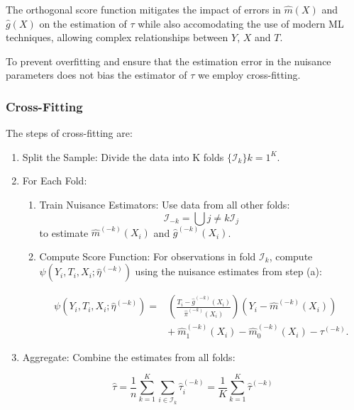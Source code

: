 \documentclass{article}
\numberwithin{equation}{section}
\begin{document}
The orthogonal score function mitigates the impact of errors in $\hat{m}(X)$ and $\hat{g}(X)$ on the estimation of $\tau$ while also accomodating the use of modern ML techniques, allowing complex relationships between $Y$, $X$ and $T$.

To prevent overfitting and ensure that the estimation error in the nuisance parameters does not bias the estimator of $\tau$ we employ cross-fitting.

\subsubsection{Cross-Fitting}

The steps of cross-fitting are:

\begin{enumerate}
\item Split the Sample: Divide the data into K folds $\{\mathcal{I}_k\}{k=1}^K$.
\item For Each Fold:
\begin{enumerate}
\item Train Nuisance Estimators: Use data from all other folds:
$$
\mathcal{I}_{-k} = \bigcup{j \neq k} \mathcal{I}_j
$$
to estimate $\hat{m}^{(-k)}(X_i)$ and $\hat{g}^{(-k)}(X_i)$.

\item Compute Score Function: For observations in fold $\mathcal{I}_k$, compute $\psi(Y_i, T_i, X_i; \hat{\eta}^{(-k)})$ using the nuisance estimates from step (a):

\begin{equation}
    \begin{split}
        \psi(Y_i, T_i, X_i; \hat{\eta}^{(-k)}) = & \left( \frac{T_i - \hat{g}^{(-k)}(X_i)}{\hat{\pi}^{(-k)}(X_i)} \right) (Y_i - \hat{m}^{(-k)}(X_i)) \\
        & + \ \hat{m}_1^{(-k)}(X_i) - \hat{m}_0^{(-k)}(X_i) - \tau^{(-k)}.
    \end{split}
    \label{eq:orthogonal_score_fold_k}
\end{equation}

\end{enumerate}
\item Aggregate: Combine the estimates from all folds:

\begin{equation}
\hat{\tau} = \frac{1}{n} \sum_{k=1}^K \sum_{i \in \mathcal{I}_k} \hat{\tau}_i^{(-k)} =  \frac{1}{K} \sum_{k=1}^K \hat{\tau}^{(-k)}
\label{eq:avg_tau_hat}
\end{equation}

\end{enumerate}
\end{document}
